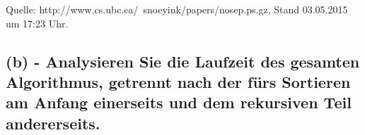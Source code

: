 \documentclass[a4paper]{article}
\begin{document}
Quelle: http://www.cs.ubc.ca/~snoeyink/papers/nosep.ps.gz, Stand 03.05.2015 um 17:23 Uhr. 

\subsection*{(b) - Analysieren Sie die Laufzeit des gesamten Algorithmus, getrennt nach der fürs 
Sortieren am Anfang einerseits und dem rekursiven Teil andererseits. }
\end{document}
